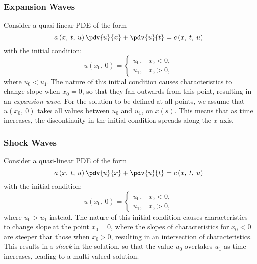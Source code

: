\documentclass{article}
\theoremstyle{definition}
\begin{document}
\subsubsection{Expansion Waves}
Consider a quasi-linear PDE of the form
\begin{equation*}
    a\left( x,\: t,\: u \right) \pdv{u}{x} + \pdv{u}{t} = c\left( x,\: t,\: u \right)
\end{equation*}
with the initial condition:
\begin{equation*}
    u\left( x_0,\: 0 \right) =
    \begin{cases}
        u_0, & x_0 < 0, \\
        u_1, & x_0 > 0,
    \end{cases}
\end{equation*}
where \(u_0 < u_1\). The nature of this initial condition causes
characteristics to change slope when \(x_0 = 0\), so that they fan
outwards from this point, resulting in an \textit{expansion wave}. For
the solution to be defined at all points, we assume that
\(u\left( x_0,\: 0 \right)\) takes all values between \(u_0\) and \(u_1\),
on \(x\left( s \right)\). This means that as time increases, the
discontinuity in the initial condition spreads along the \(x\)-axis.
\subsubsection{Shock Waves}
Consider a quasi-linear PDE of the form
\begin{equation*}
    a\left( x,\: t,\: u \right) \pdv{u}{x} + \pdv{u}{t} = c\left( x,\: t,\: u \right)
\end{equation*}
with the initial condition:
\begin{equation*}
    u\left( x_0,\: 0 \right) =
    \begin{cases}
        u_0, & x_0 < 0, \\
        u_1, & x_0 > 0,
    \end{cases}
\end{equation*}
where \(u_0 > u_1\) instead. The nature of this initial condition causes
characteristics to change slope at the point \(x_0 = 0\), where the
slopes of characteristics for \(x_0 < 0\) are steeper than those when
\(x_0 > 0\), resulting in an intersection of characteristics.
This results in a \textit{shock} in the solution, so that the value \(u_0\)
overtakes \(u_1\) as time increases, leading to a multi-valued solution.
\end{document}
